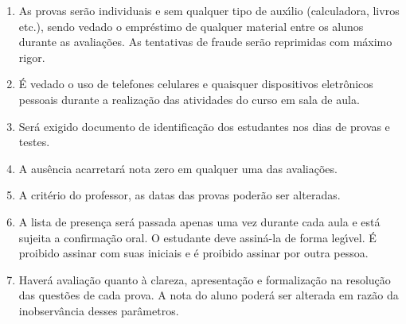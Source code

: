 \documentclass[12pt]{exam}
\begin{document}
\begin{enumerate}[label={\arabic*})]
\item As provas ser\~{a}o individuais e sem qualquer tipo de
aux\'{\i}lio (calculadora, livros etc.), sendo vedado o empr\'{e}stimo de
qualquer material entre os alunos durante as avalia\c{c}\~{o}es. As
tentativas de fraude ser\~{a}o reprimidas com m\'{a}ximo rigor.

\item \'{E} vedado o uso de telefones celulares e quaisquer dispositivos
eletr\^{o}nicos pessoais durante a realiza\c{c}\~{a}o das atividades do curso
em sala de aula.

\item Ser\'{a} exigido documento de identifica\c{c}\~{a}o dos estudantes nos
dias de provas e testes.

\item A aus\^{e}ncia acarretar\'{a} nota zero em qualquer uma das
avalia\c{c}\~{o}es.

\item A crit\'{e}rio do professor, as datas das provas poder\~{a}o
ser alteradas.

\item A lista de presen\c{c}a ser\'{a} passada apenas uma vez
durante cada aula e est\'{a} sujeita a confirma\c{c}\~{a}o oral. O
estudante deve assin\'{a}-la de forma leg{\'\i}vel. {\'E} proibido assinar
com suas iniciais e \'{e} proibido assinar por outra pessoa.

\item Haver{\'a} avalia{\c c}{\~a}o quanto {\`a} clareza, apresenta{\c
c}{\~a}o e formaliza{\c c}{\~a}o na  resolu{\c c}{\~a}o das quest{\~o}es de
cada prova. A nota do aluno poder{\'a} ser alterada em raz{\~a}o da
inobserv{\^a}ncia desses par{\^a}metros.
\end{enumerate}
\end{document}
